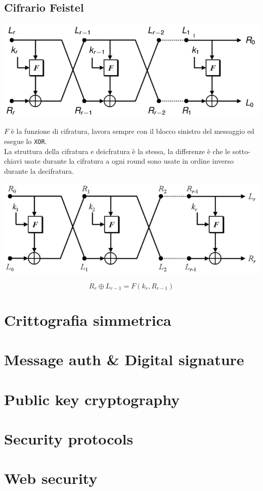 \documentclass[12pt, a4paper]{report}
\begin{document}
\section{Cifrario Feistel}
\begin{center}
    \includegraphics[width=\textwidth]{Immagini/feistelc.png}
\end{center}
$F$ è la funzione di cifratura, lavora sempre con il blocco sinistro del messaggio ed esegue lo \texttt{XOR}.\\
La struttura della cifratura e deicfratura è la stessa, la differenze è che le sotto-chiavi usate durante la cifratura a ogni round sono usate in ordine inverso durante la decifratura.
\begin{center}
    \includegraphics[width=\textwidth]{Immagini/feisteld.png}
\end{center}
\begin{equation*}
    R_{r}\oplus L_{r-1} = F(k_{r},R_{r-1})
\end{equation*}
\chapter{Crittografia simmetrica}
\chapter{Message auth \& Digital signature}
\chapter{Public key cryptography}
\chapter{Security protocols}
\chapter{Web security}
\end{document}
